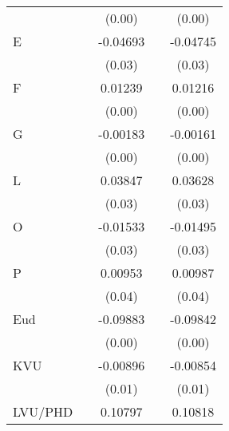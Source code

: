 \begin{table}[htbp]
\begin{tabular}{l*{4}{c}}
                    &                     &      (0.00)         &                     &      (0.00)         \\
E                   &                     &    -0.04693         &                     &    -0.04745         \\
                    &                     &      (0.03)         &                     &      (0.03)         \\
F                   &                     &     0.01239\sym{**} &                     &     0.01216\sym{**} \\
                    &                     &      (0.00)         &                     &      (0.00)         \\
G                   &                     &    -0.00183         &                     &    -0.00161         \\
                    &                     &      (0.00)         &                     &      (0.00)         \\
L                   &                     &     0.03847         &                     &     0.03628         \\
                    &                     &      (0.03)         &                     &      (0.03)         \\
O                   &                     &    -0.01533         &                     &    -0.01495         \\
                    &                     &      (0.03)         &                     &      (0.03)         \\
P                   &                     &     0.00953         &                     &     0.00987         \\
                    &                     &      (0.04)         &                     &      (0.04)         \\
Eud                 &                     &    -0.09883\sym{***}&                     &    -0.09842\sym{***}\\
                    &                     &      (0.00)         &                     &      (0.00)         \\
KVU                 &                     &    -0.00896         &                     &    -0.00854         \\
                    &                     &      (0.01)         &                     &      (0.01)         \\
LVU/PHD             &                     &     0.10797\sym{***}&                     &     0.10818\sym{***}\\

\end{tabular}
\end{table}
